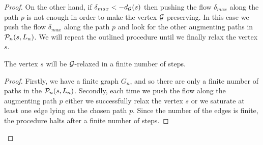 \documentclass[12pt]{amsart}
\begin{document}
\begin{proof}
        On the other hand, if $\delta_{max} < -d_{\cal{G}}(s)$ then pushing the flow $\delta_{max}$ along the path $p$ is not enough
          in order to make the vertex $\cal{G}$-preserving.
        In this case we push the flow $\delta_{max}$ along the path $p$ and look for the other augmenting paths in $\gnpaths(s, L_n)$.
        We will repeat the outlined procedure until we finally relax the vertex $s$.
        \begin{prop}
          The vertex $s$ will be $\cal{G}$-relaxed in a finite number of steps.
        \end{prop}
        \begin{proof}
          Firstly, we have a finite graph $G_{n}$, and so there are only a finite number of paths in the $\gnpaths(s, L_n)$.
          Secondly, each time we push the flow along the augmenting path $p$ either we successfully relax the vertex $s$
            or we saturate at least one edge lying on the chosen path $p$.
          Since the number of the edges is finite, the procedure halts after a finite number of steps.


\end{proof}
\end{proof}
\end{document}
